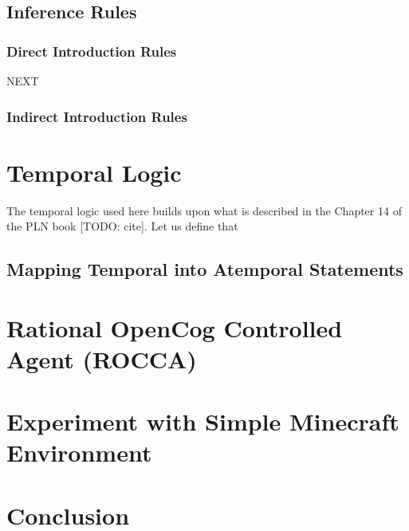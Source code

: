 \documentclass[runningheads]{llncs}
\begin{document}
\subsection{Inference Rules}

\subsubsection{Direct Introduction Rules}

NEXT

\subsubsection{Indirect Introduction Rules}

\section{Temporal Logic}

The temporal logic used here builds upon what is described in the
Chapter 14 of the PLN book [TODO: cite].  Let us define that

\subsection{Mapping Temporal into Atemporal Statements}



\section{Rational OpenCog Controlled Agent (ROCCA)}

\section{Experiment with Simple Minecraft Environment}

\section{Conclusion}

%
%
 
\end{document}

